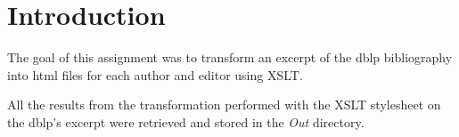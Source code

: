 \section{Introduction}

The goal of this assignment was to transform an excerpt of the dblp bibliography
into html files for each author and editor using XSLT.

\begin{framehint}
    All the results from the transformation performed with the XSLT stylesheet
    on the dblp's excerpt were retrieved and stored in the \emph{Out} directory.
\end{framehint}
